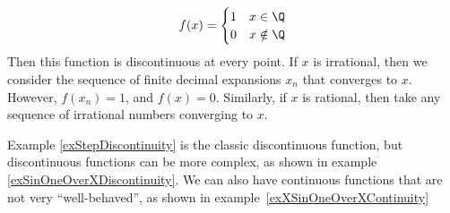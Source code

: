 \documentclass[../Main.tex]{subfiles}
\begin{document}
\begin{examples}{\label{exContinuityExamples}}
        \begin{equation*}
            f(x) = 
            \begin{cases}
                1 & x \in \Q \\
                0 & x \notin \Q
            \end{cases}
        \end{equation*}
        Then this function is discontinuous at every point. If $x$ is irrational, then we consider the sequence of finite decimal expansions $x_n$ that converges to $x$. However, $f(x_n) = 1$, and $f(x) = 0$. Similarly, if $x$ is rational, then take any sequence of irrational numbers converging to $x$. \label{exDirichletDiscontinuity}
\end{examples}
Example \ref{exStepDiscontinuity} is the classic discontinuous function, but discontinuous functions can be more complex, as shown in example \ref{exSinOneOverXDiscontinuity}. We can also have continuous functions that are not very ``well-behaved'', as shown in example~\ref{exXSinOneOverXContinuity}
\end{document}

